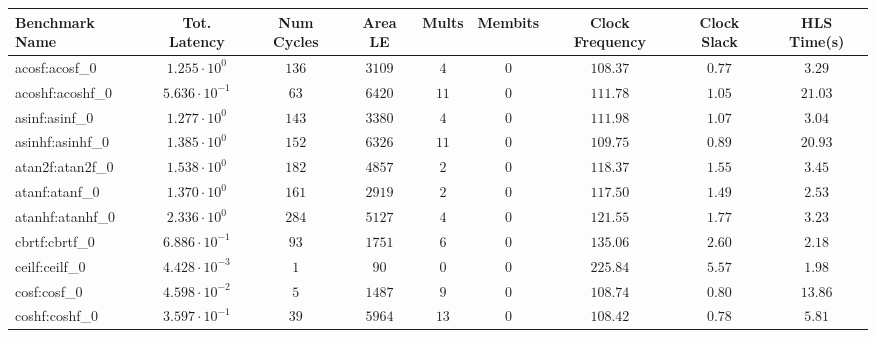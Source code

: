 \begin{tabular}{|l|c|c|c|c|c|c|c|c|}
\hline
Benchmark Name               & Tot. Latency            & Num Cycles & Area LE    & Mults   & Membits & Clock Frequency & Clock Slack & HLS Time(s) \\
\hline
acosf:acosf\_0               & $ 1.255 \cdot 10^{0}  $ & $ 136    $ & $ 3109   $ & $ 4   $ & $ 0   $ & $ 108.37      $ & $ 0.77    $ & $ 3.29    $ \\
acoshf:acoshf\_0             & $ 5.636 \cdot 10^{-1} $ & $ 63     $ & $ 6420   $ & $ 11  $ & $ 0   $ & $ 111.78      $ & $ 1.05    $ & $ 21.03   $ \\
asinf:asinf\_0               & $ 1.277 \cdot 10^{0}  $ & $ 143    $ & $ 3380   $ & $ 4   $ & $ 0   $ & $ 111.98      $ & $ 1.07    $ & $ 3.04    $ \\
asinhf:asinhf\_0             & $ 1.385 \cdot 10^{0}  $ & $ 152    $ & $ 6326   $ & $ 11  $ & $ 0   $ & $ 109.75      $ & $ 0.89    $ & $ 20.93   $ \\
atan2f:atan2f\_0             & $ 1.538 \cdot 10^{0}  $ & $ 182    $ & $ 4857   $ & $ 2   $ & $ 0   $ & $ 118.37      $ & $ 1.55    $ & $ 3.45    $ \\
atanf:atanf\_0               & $ 1.370 \cdot 10^{0}  $ & $ 161    $ & $ 2919   $ & $ 2   $ & $ 0   $ & $ 117.50      $ & $ 1.49    $ & $ 2.53    $ \\
atanhf:atanhf\_0             & $ 2.336 \cdot 10^{0}  $ & $ 284    $ & $ 5127   $ & $ 4   $ & $ 0   $ & $ 121.55      $ & $ 1.77    $ & $ 3.23    $ \\
cbrtf:cbrtf\_0               & $ 6.886 \cdot 10^{-1} $ & $ 93     $ & $ 1751   $ & $ 6   $ & $ 0   $ & $ 135.06      $ & $ 2.60    $ & $ 2.18    $ \\
ceilf:ceilf\_0               & $ 4.428 \cdot 10^{-3} $ & $ 1      $ & $ 90     $ & $ 0   $ & $ 0   $ & $ 225.84      $ & $ 5.57    $ & $ 1.98    $ \\
cosf:cosf\_0                 & $ 4.598 \cdot 10^{-2} $ & $ 5      $ & $ 1487   $ & $ 9   $ & $ 0   $ & $ 108.74      $ & $ 0.80    $ & $ 13.86   $ \\
coshf:coshf\_0               & $ 3.597 \cdot 10^{-1} $ & $ 39     $ & $ 5964   $ & $ 13  $ & $ 0   $ & $ 108.42      $ & $ 0.78    $ & $ 5.81    $ \\

\end{tabular}
